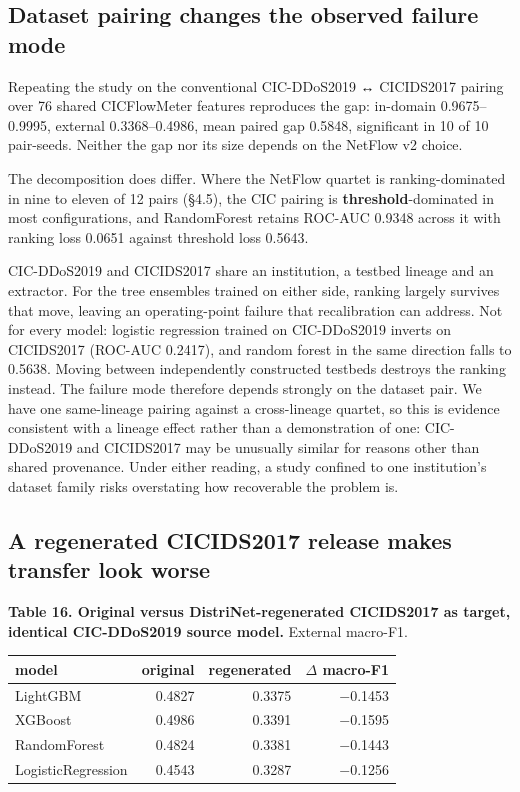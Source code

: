 \documentclass[journal]{IEEEtran}
\begin{document}
\subsection{Dataset pairing changes the observed failure mode}

Repeating the study on the conventional CIC-DDoS2019 ↔ CICIDS2017 pairing over 76 shared CICFlowMeter features reproduces the gap: in-domain 0.9675--0.9995, external 0.3368--0.4986, mean paired gap 0.5848, significant in 10 of 10 pair-seeds. Neither the gap nor its size depends on the NetFlow v2 choice.

The decomposition does differ. Where the NetFlow quartet is ranking-dominated in nine to eleven of 12 pairs (§4.5), the CIC pairing is \textbf{threshold}-dominated in most configurations, and RandomForest retains ROC-AUC 0.9348 across it with ranking loss 0.0651 against threshold loss 0.5643.

CIC-DDoS2019 and CICIDS2017 share an institution, a testbed lineage and an extractor. For the tree ensembles trained on either side, ranking largely survives that move, leaving an operating-point failure that recalibration can address. Not for every model: logistic regression trained on CIC-DDoS2019 inverts on CICIDS2017 (ROC-AUC 0.2417), and random forest in the same direction falls to 0.5638. Moving between independently constructed testbeds destroys the ranking instead. The failure mode therefore depends strongly on the dataset pair. We have one same-lineage pairing against a cross-lineage quartet, so this is evidence consistent with a lineage effect rather than a demonstration of one: CIC-DDoS2019 and CICIDS2017 may be unusually similar for reasons other than shared provenance. Under either reading, a study confined to one institution's dataset family risks overstating how recoverable the problem is.

\subsection{A regenerated CICIDS2017 release makes transfer look worse}

\textbf{Table 16. Original versus DistriNet-regenerated CICIDS2017 as target, identical CIC-DDoS2019 source model.} External macro-F1.

\begin{table}[htbp]\centering\scriptsize
\begin{tabular}{lrrr}
\toprule
model & original & regenerated & $\Delta$ macro-F1 \\
\midrule
LightGBM & 0.4827 & 0.3375 & $-$0.1453 \\
XGBoost & 0.4986 & 0.3391 & $-$0.1595 \\
RandomForest & 0.4824 & 0.3381 & $-$0.1443 \\
LogisticRegression & 0.4543 & 0.3287 & $-$0.1256 \\
\bottomrule
\end{tabular}
\end{table}
\end{document}
